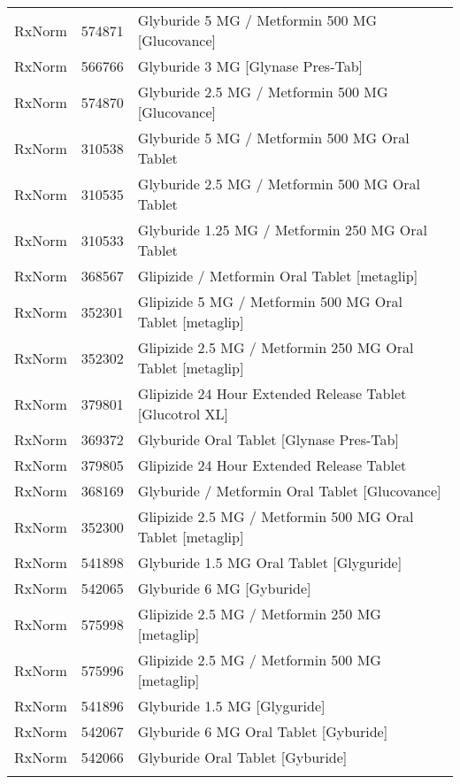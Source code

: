 \begin{longtable}{p{}p{}p{}}
  RxNorm & 574871 & Glyburide 5 MG / Metformin 500 MG [Glucovance] \\ 
  RxNorm & 566766 & Glyburide 3 MG [Glynase Pres-Tab] \\ 
  RxNorm & 574870 & Glyburide 2.5 MG / Metformin 500 MG [Glucovance] \\ 
  RxNorm & 310538 & Glyburide 5 MG / Metformin 500 MG Oral Tablet \\ 
  RxNorm & 310535 & Glyburide 2.5 MG / Metformin 500 MG Oral Tablet \\ 
  RxNorm & 310533 & Glyburide 1.25 MG / Metformin 250 MG Oral Tablet \\ 
  RxNorm & 368567 & Glipizide / Metformin Oral Tablet [metaglip] \\ 
  RxNorm & 352301 & Glipizide 5 MG / Metformin 500 MG Oral Tablet [metaglip] \\ 
  RxNorm & 352302 & Glipizide 2.5 MG / Metformin 250 MG Oral Tablet [metaglip] \\ 
  RxNorm & 379801 & Glipizide 24 Hour Extended Release Tablet [Glucotrol XL] \\ 
  RxNorm & 369372 & Glyburide Oral Tablet [Glynase Pres-Tab] \\ 
  RxNorm & 379805 & Glipizide 24 Hour Extended Release Tablet \\ 
  RxNorm & 368169 & Glyburide / Metformin Oral Tablet [Glucovance] \\ 
  RxNorm & 352300 & Glipizide 2.5 MG / Metformin 500 MG Oral Tablet [metaglip] \\ 
  RxNorm & 541898 & Glyburide 1.5 MG Oral Tablet [Glyguride] \\ 
  RxNorm & 542065 & Glyburide 6 MG [Gyburide] \\ 
  RxNorm & 575998 & Glipizide 2.5 MG / Metformin 250 MG [metaglip] \\ 
  RxNorm & 575996 & Glipizide 2.5 MG / Metformin 500 MG [metaglip] \\ 
  RxNorm & 541896 & Glyburide 1.5 MG [Glyguride] \\ 
  RxNorm & 542067 & Glyburide 6 MG Oral Tablet [Gyburide] \\ 
  RxNorm & 542066 & Glyburide Oral Tablet [Gyburide] \\ 
  \hline
\label{tab:codes_sulfonylurea-medications}
\end{longtable}
